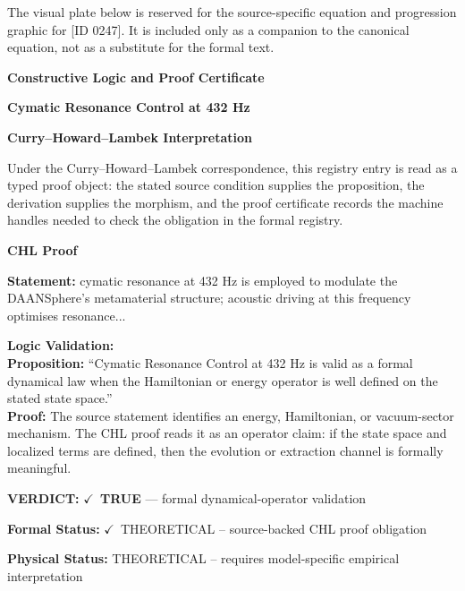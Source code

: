 \begingroup\footnotesize\sloppy
The visual plate below is reserved for the source-specific equation and progression graphic for [ID 0247]. It is included only as a companion to the canonical equation, not as a substitute for the formal text.
\par\endgroup
\ifTZPDarkEdition
{}
\fi

\clearpage
\begingroup\tzpsupportsetup
\noindent\textbf{\fontsize{10.8pt}{12.8pt}\selectfont [ID 0247] Constructive Logic and Proof Certificate}\par
\noindent\textbf{\fontsize{10pt}{12pt}\selectfont Cymatic Resonance Control at 432 Hz}\par
\vspace{0.45em}
\begingroup
\footnotesize
\setlength{\parskip}{0.22em}
\setlength{\parindent}{0pt}
\noindent\textbf{Curry--Howard--Lambek Interpretation}\par
Under the Curry--Howard--Lambek correspondence, this registry entry is read as a typed proof
object: the stated source condition supplies the proposition, the derivation supplies the
morphism, and the proof certificate records the machine handles needed to check the obligation
in the formal registry.

\vspace{0.45em}
\noindent\textbf{CHL Proof}\par
\textbf{Statement:} cymatic resonance at 432 Hz is employed to modulate the DAANSphere's metamaterial
structure; acoustic driving at this frequency optimises resonance...

\textbf{Logic Validation:}\\
\textbf{Proposition:} ``Cymatic Resonance Control at 432 Hz is valid as a formal dynamical law when the
Hamiltonian or energy operator is well defined on the stated state space.''\\
\textbf{Proof:} The source statement identifies an energy, Hamiltonian, or vacuum-sector mechanism. The
CHL proof reads it as an operator claim: if the state space and localized terms are
defined, then the evolution or extraction channel is formally meaningful.

\textbf{VERDICT:} \ensuremath{\checkmark}\ \textbf{TRUE} --- formal dynamical-operator validation

\textbf{Formal Status:} \ensuremath{\checkmark}\ THEORETICAL -- source-backed CHL proof obligation

\textbf{Physical Status:} THEORETICAL -- requires model-specific empirical interpretation
\par\vspace{0.45em}
\par
\ifTZPDarkEdition
{}
\fi
\endgroup
\endgroup
